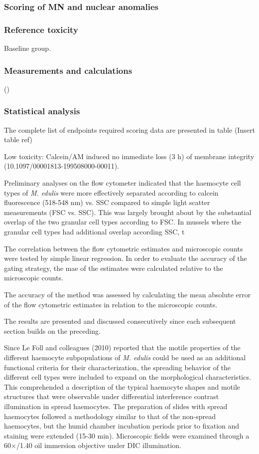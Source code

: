\subsubsection{Scoring of MN and nuclear anomalies}

\subsubsection{Reference toxicity}
Baseline group.

\subsubsection{Measurements and calculations}
(\cite{R-project})

\subsubsection{Statistical analysis}


The complete list of endpoints required scoring data are presented in table (Insert table ref)

Low toxicity: Calcein/AM induced no immediate loss (3 h) of membrane integrity (10.1097/00001813-199508000-00011).

Preliminary analyses on the flow cytometer indicated that the haemocyte cell types of \emph{M. edulis} were more effectively separated according to calcein fluorescence (518-548 nm) vs. SSC compared to simple light scatter measurements (FSC vs. SSC). This was largely brought about by the substantial overlap of the two granular cell types according to FSC. In mussels where the granular cell types had additional overlap according SSC, t

The correlation between the flow cytometric estimates and microscopic counts were tested by simple linear regression. In order to evaluate the accuracy of the gating strategy, the \acrshort{mae} of the estimates were calculated relative to the microscopic counts.

The accuracy of the method was assessed by calculating the mean absolute error of the flow cytometric estimates in relation to the microscopic counts.

The results are presented and discussed consecutively since each subsequent section builds on the preceding.

Since Le Foll and colleagues (2010) reported that the motile properties of the different haemocyte subpopulations of \emph{M. edulis} could be used as an additional functional criteria for their characterization, the spreading behavior of the different cell types were included to expand on the morphological characteristics. This comprehended a description of the typical haemocyte shapes and motile structures that were observable under differential interference contrast illumination in spread haemocytes. The preparation of slides with spread haemocytes followed a methodology similar to that of the non-spread haemocytes, but the humid chamber incubation periods prior to fixation and staining were extended (15-30 min). Microscopic fields were examined through a 60$\times$/1.40 oil immersion objective under DIC illumination.

